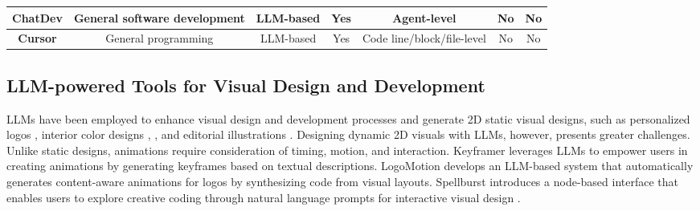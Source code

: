 \begin{table*}[]
\begin{tabular}{|c|c|c|c|c|c|c|}
{ \textbf{ChatDev \cite{qian2024chatdev}}}     & { General software development}    & { LLM-based}       & { Yes}                                                                              & { Agent-level}                                                             & { No}                                                                    & { No}                                                                  \\ \hline
{ \textbf{Cursor \cite{cursor2023}}} & { General programming}             & { LLM-based}       & { Yes}                                                                              & { Code line/block/file-level}                                              & { No}                                                                    & { No}                                                                  \\ \hline
\end{tabular}
\label{tab:comparison}
\end{table*}

\subsection{LLM-powered Tools for Visual Design and Development}
LLMs {have been} %
employed to enhance visual design \cite{brade2023promptify} and development processes {and generate} %
2D static visual design{s}, %
such as personalized logos \cite{xiao2024typedance}, interior color designs \cite{hou2024c2ideas}, , and editorial illustrations \cite{liu2022opal}. Designing dynamic 2D visuals {with LLMs}, however, presents greater challenges. Unlike static designs, animations require consideration of timing, motion, and interaction. Keyframer \cite{tseng2024keyframer} leverages LLMs to empower users in creating animations by generating keyframes based on textual descriptions. LogoMotion \cite{liu2024logomotion} develops an LLM-based system that automatically generates content-aware animations for logos by synthesizing code from visual layouts. Spellburst \cite{angert2023spellburst} introduces a node-based interface that enables users to explore creative coding through natural language prompts for interactive visual design . 

